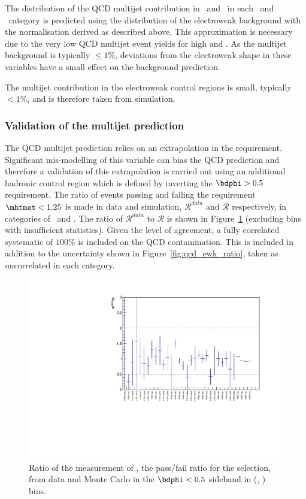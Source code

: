 The distribution of the QCD multijet contribution in \nb~and \mht~in each \scalht~and \njet~category
is predicted using the distribution of the electroweak background with the normalisation
derived as described above. This approximation is necessary due to the very low QCD multijet
event yields for high \nb and \mht. As the multijet background is typically $\le 1\%$, 
deviations from the electroweak shape in these variables have a small effect on the background prediction.

The multijet contribution in the electroweak control regions is small, typically $<1\%$, and is 
therefore taken from simulation.

\subsubsection{Validation of the multijet prediction}

The QCD multijet prediction relies on an extrapolation in the \mhtmet requirement.
Significant mis-modelling of this variable can bias the QCD prediction and therefore a validation
of this extrapolation is carried out using an additional hadronic control 
region which is defined by inverting the $\bdphi > 0.5$ requirement. The ratio of events passing and failing 
the requirement $\mhtmet < 1.25$ is made in data and simulation, $\mathcal{R}^{data}$ and $\mathcal{R}$ respectively,
in categories of \njet~and \scalht. The ratio of $\mathcal{R}^{data}$ to $\mathcal{R}$ is shown in
Figure~\ref{fig:RR_qcd} (excluding bins with insufficient statistics). 
Given the level of agreement, a fully correlated systematic of $100\%$ is included on
the QCD contamination. This is included in addition to the uncertainty shown in 
Figure~\ref{fig:qcd_ewk_ratio}, taken as uncorrelated in each category.

\begin{figure}[h!]
  \begin{center}        
    \includegraphics[width=\textwidth]{figures/qcd/plots/doubleQcdSbSrRatio1D}
    \caption{ Ratio of the measurement of \rmhtmet, the pass/fail ratio for the \mhtmet selection, from data and Monte Carlo in the $\bdphi < 0.5$ sideband in (\scalht, \njet) bins.  
    }
    \label{fig:RR_qcd}
  \end{center} 
\end{figure}

